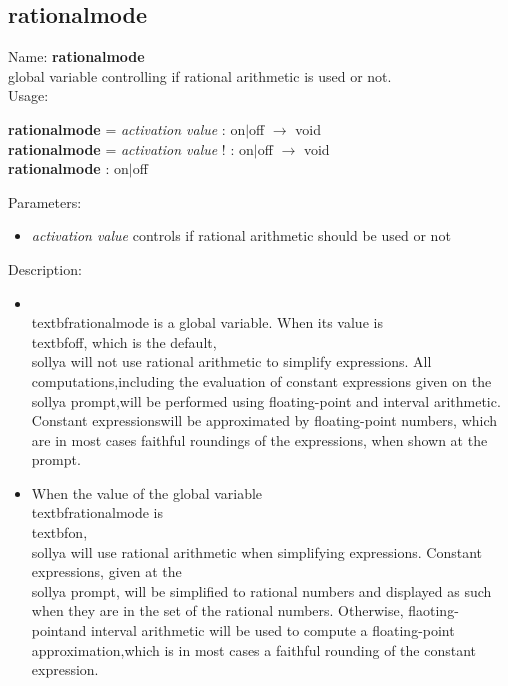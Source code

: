 \subsection{rationalmode}
\label{labrationalmode}
\noindent Name: \textbf{rationalmode}\\
global variable controlling if rational arithmetic is used or not.\\
\noindent Usage: 
\begin{center}
\textbf{rationalmode} = \emph{activation value} : \textsf{on$|$off} $\rightarrow$ \textsf{void}\\
\textbf{rationalmode} = \emph{activation value} ! : \textsf{on$|$off} $\rightarrow$ \textsf{void}\\
\textbf{rationalmode} : \textsf{on$|$off}\\
\end{center}
Parameters: 
\begin{itemize}
\item \emph{activation value} controls if rational arithmetic should be used or not
\end{itemize}
\noindent Description: \begin{itemize}

\item \\textbf{rationalmode} is a global variable. When its value is \\textbf{off}, which is the default,\n   \\sollya will not use rational arithmetic to simplify expressions. All computations,\n   including the evaluation of constant expressions given on the \\sollya prompt,\n   will be performed using floating-point and interval arithmetic. Constant expressions\n   will be approximated by floating-point numbers, which are in most cases faithful \n   roundings of the expressions, when shown at the prompt. \n
\item When the value of the global variable \\textbf{rationalmode} is \\textbf{on}, \\sollya will use \n   rational arithmetic when simplifying expressions. Constant expressions, given \n   at the \\sollya prompt, will be simplified to rational numbers and displayed \n   as such when they are in the set of the rational numbers. Otherwise, flaoting-point\n   and interval arithmetic will be used to compute a floating-point approximation,\n   which is in most cases a faithful rounding of the constant expression.\n\end{itemize}
